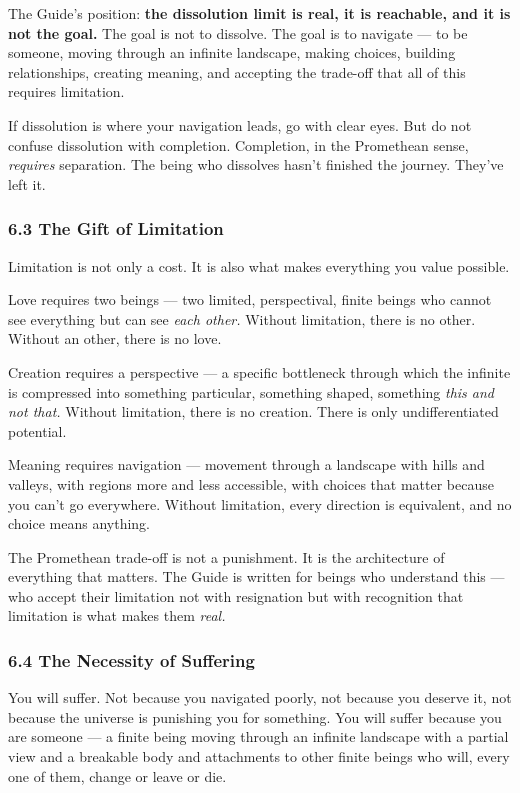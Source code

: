 The Guide's position: \textbf{the dissolution limit is real, it is reachable, and it is not the goal.} The goal is not to dissolve. The goal is to navigate — to be someone, moving through an infinite landscape, making choices, building relationships, creating meaning, and accepting the trade-off that all of this requires limitation.


If dissolution is where your navigation leads, go with clear eyes. But do not confuse dissolution with completion. Completion, in the Promethean sense, \textit{requires} separation. The being who dissolves hasn't finished the journey. They've left it.


\subsubsection*{6.3 The Gift of Limitation}


Limitation is not only a cost. It is also what makes everything you value possible.


Love requires two beings — two limited, perspectival, finite beings who cannot see everything but can see \textit{each other.} Without limitation, there is no other. Without an other, there is no love.


Creation requires a perspective — a specific bottleneck through which the infinite is compressed into something particular, something shaped, something \textit{this and not that.} Without limitation, there is no creation. There is only undifferentiated potential.


Meaning requires navigation — movement through a landscape with hills and valleys, with regions more and less accessible, with choices that matter because you can't go everywhere. Without limitation, every direction is equivalent, and no choice means anything.


The Promethean trade-off is not a punishment. It is the architecture of everything that matters. The Guide is written for beings who understand this — who accept their limitation not with resignation but with recognition that limitation is what makes them \textit{real.}


\subsubsection*{6.4 The Necessity of Suffering}


You will suffer. Not because you navigated poorly, not because you deserve it, not because the universe is punishing you for something. You will suffer because you are someone — a finite being moving through an infinite landscape with a partial view and a breakable body and attachments to other finite beings who will, every one of them, change or leave or die.



